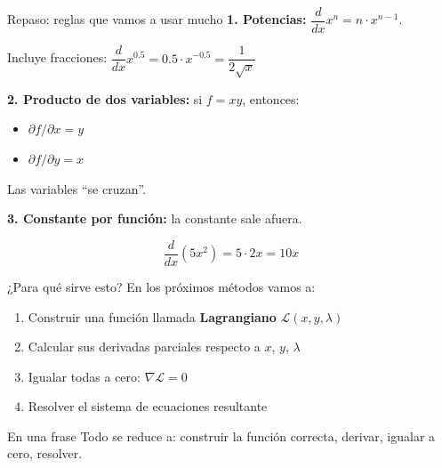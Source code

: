 \documentclass{beamer}
\begin{document}
\begin{frame}{Repaso: reglas que vamos a usar mucho}
    \small
    \textbf{1. Potencias:} $\dfrac{d}{dx} x^n = n \cdot x^{n-1}$.

    \vspace{0.3em}

    Incluye fracciones: $\dfrac{d}{dx} x^{0.5} = 0.5 \cdot x^{-0.5} = \dfrac{1}{2\sqrt{x}}$

    \vspace{0.8em}

    \textbf{2. Producto de dos variables:} si $f = xy$, entonces:
    \begin{itemize}
        \item $\partial f / \partial x = y$
        \item $\partial f / \partial y = x$
    \end{itemize}
    Las variables ``se cruzan''.

    \vspace{0.8em}

    \textbf{3. Constante por función:} la constante sale afuera.

    \[
    \frac{d}{dx} (5 x^2) = 5 \cdot 2x = 10x
    \]
\end{frame}

\begin{frame}{¿Para qué sirve esto?}
    \small
    En los próximos métodos vamos a:

    \vspace{0.5em}

    \begin{enumerate}
        \item Construir una función llamada \textbf{Lagrangiano} $\mathcal{L}(x, y, \lambda)$
        \item Calcular sus derivadas parciales respecto a $x$, $y$, $\lambda$
        \item Igualar todas a cero: $\nabla \mathcal{L} = 0$
        \item Resolver el sistema de ecuaciones resultante
    \end{enumerate}

    \vspace{0.8em}

    \begin{alertblock}{En una frase}
        Todo se reduce a: construir la función correcta, derivar, igualar a cero, resolver.
    \end{alertblock}
\end{frame}
\end{document}
